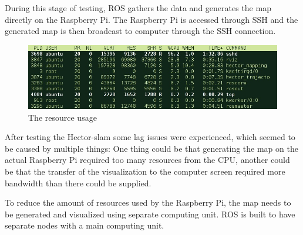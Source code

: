 During this stage of testing, ROS gathers the data and generates the map directly on the Raspberry Pi. The Raspberry Pi is accessed through SSH and the generated map is then broadcast to computer through the SSH connection.

\begin{figure}[H]
	\centering
	\includegraphics[width=.8\linewidth]{images/rvisScreenshotCropped.jpg}
	\caption{The resource usage}
\end{figure}


After testing the Hector-slam some lag issues were experienced, which seemed to be caused by multiple things: One thing could be that generating the map on the actual Raspberry Pi required too many resources from the CPU, another could be that the transfer of the visualization to the computer screen required more bandwidth than there could be supplied.

To reduce the amount of resources used by the Raspberry Pi, the map needs to be generated and visualized using separate computing unit. ROS is built to have separate nodes with a main computing unit.


